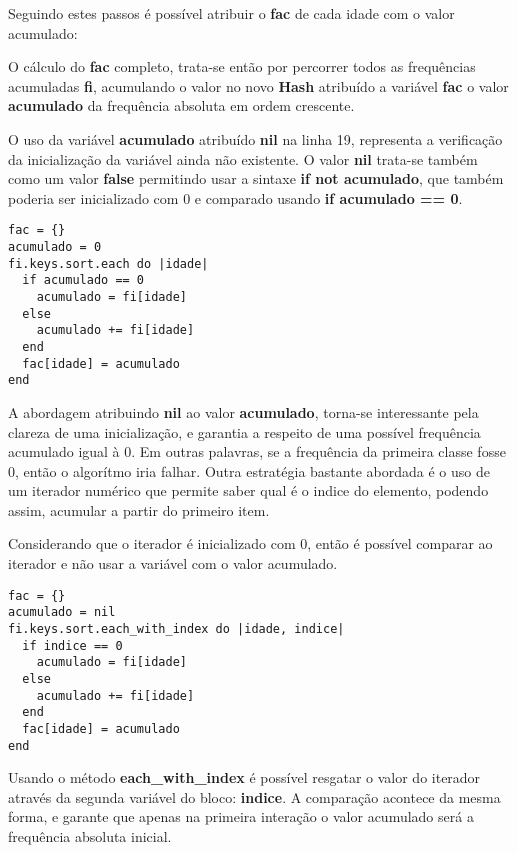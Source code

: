 \documentclass[espaco=simples,appendix=Name]{abnt}
\newcommand{\code}[1] {\textbf{#1}}
\begin{document}
Seguindo estes passos é possível atribuir o \code{fac} de cada idade com o valor acumulado:

 

O cálculo do \code{fac} completo, trata-se então por percorrer todos as frequências acumuladas \code{fi}, acumulando o valor no novo \code{Hash} atribuído a variável \code{fac} o valor \code{acumulado} da frequência absoluta em ordem crescente.

 

O uso da variável \code{acumulado} atribuído \code{nil} na linha 19, representa a verificação da inicialização da variável ainda não existente. O valor \code{nil} trata-se também como um valor \code{false} permitindo usar a sintaxe \code{if not acumulado}, que também poderia ser inicializado com 0 e comparado usando \code{if acumulado == 0}.

\begin{lstlisting}[caption=Usando acumulado com valor inicial 0]
fac = {}
acumulado = 0 
fi.keys.sort.each do |idade|
  if acumulado == 0
    acumulado = fi[idade]
  else
    acumulado += fi[idade]
  end
  fac[idade] = acumulado
end
\end{lstlisting}

A abordagem atribuindo \code{nil} ao valor \code{acumulado}, torna-se interessante pela clareza de uma inicialização, e garantia a respeito de uma possível frequência acumulado igual à 0. Em outras palavras, se a frequência da primeira classe fosse 0, então o algorítmo iria falhar. Outra estratégia bastante abordada é o uso de um iterador numérico que permite saber qual é o indice do elemento, podendo assim, acumular a partir do primeiro item.

Considerando que o iterador é inicializado com 0, então é possível comparar ao iterador e não usar a variável com o valor acumulado.


\begin{lstlisting}[caption=Usando acumulado através do iterador \code{indice}, label=usa indice]
fac = {}
acumulado = nil
fi.keys.sort.each_with_index do |idade, indice|
  if indice == 0
    acumulado = fi[idade]
  else
    acumulado += fi[idade]
  end
  fac[idade] = acumulado
end
\end{lstlisting}

Usando o método \code{each\_with\_index} é possível resgatar o valor do iterador através da segunda variável do bloco: \code{indice}. A comparação acontece da mesma forma, e garante que apenas na primeira interação o valor acumulado será a frequência absoluta inicial.
\end{document}
